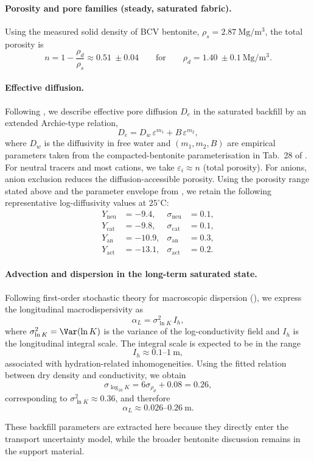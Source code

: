 \paragraph{Porosity and pore families (steady, saturated fabric).}
Using the measured solid density of BCV bentonite, $\rho_s=2.87~\mathrm{Mg/m^3}$, the total porosity is
\[
n = 1-\frac{\rho_d}{\rho_s}\approx 0.51~\pm 0.04 \qquad \text{for}\qquad \rho_d=1.40~\pm 0.1~\mathrm{Mg/m^3}.
\]

\paragraph{Effective diffusion.}
Following \cite{VanLoon2014_NTB1203}, we describe effective pore diffusion $D_{e}$ in the saturated backfill by an extended Archie-type relation,
\[
D_{e} = D_{w}\,\varepsilon^{m_1} + B\,\varepsilon^{m_2},
\]
where $D_w$ is the diffusivity in free water and $(m_1,m_2,B)$ are empirical parameters taken from the compacted-bentonite parameterisation in Tab.~28 of \cite{VanLoon2014_NTB1203}. For neutral tracers and most cations, we take $\varepsilon_i \approx n$ (total porosity). For anions, anion exclusion reduces the diffusion-accessible porosity. Using the porosity range stated above and the parameter envelope from \cite{VanLoon2014_NTB1203}, we retain the following representative log-diffusivity values at $25^\circ$C:
\begin{align*}
Y_{\mathrm{neu}} &= -9.4,& \sigma_{\mathrm{neu}}&=0.1,\\
Y_{\mathrm{cat}} &= -9.8,& \sigma_{\mathrm{cat}}&=0.1,\\
Y_{\mathrm{an}} &= -10.9,& \sigma_{\mathrm{an}}&=0.3,\\
Y_{\mathrm{act}} &= -13.1,& \sigma_{\mathrm{act}}&=0.2.
\end{align*}

\paragraph{Advection and dispersion in the long-term saturated state.}
Following first-order stochastic theory for macroscopic dispersion (\cite{Zech_Evidence_2023}), we express the longitudinal macrodispersivity as
\begin{equation}
    \label{eq:dispersivity}
    \alpha_L = \sigma_{\ln K}^2\, I_h,
\end{equation}
where $\sigma_{\ln K}^2=\Var(\ln K)$ is the variance of the log-conductivity field and $I_h$ is the longitudinal integral scale. The integral scale is expected to be in the range
\[
I_h \approx 0.1\text{--}1~\mathrm{m},
\]
associated with hydration-related inhomogeneities. Using the fitted relation between dry density and conductivity, we obtain
\[
\sigma_{\log_{10}K} = 6 \sigma_{\rho_d} + 0.08 = 0.26,
\]
corresponding to $\sigma^2_{\ln K}\approx 0.36$, and therefore
\[
\alpha_L \approx 0.026\text{--}0.26~\mathrm{m}.
\]

These backfill parameters are extracted here because they directly enter the transport uncertainty model, while the broader bentonite discussion remains in the support material.
